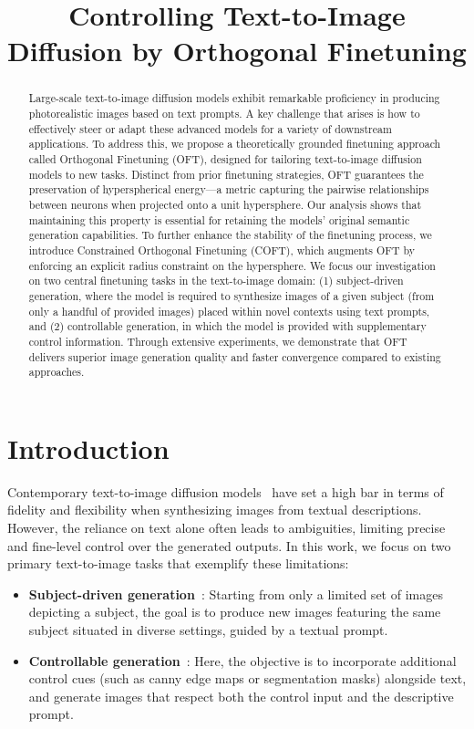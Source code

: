 \title{Controlling Text-to-Image Diffusion by Orthogonal Finetuning}

\begin{abstract}
Large-scale text-to-image diffusion models exhibit remarkable proficiency in producing photorealistic images based on text prompts. A key challenge that arises is how to effectively steer or adapt these advanced models for a variety of downstream applications. To address this, we propose a theoretically grounded finetuning approach called Orthogonal Finetuning (OFT), designed for tailoring text-to-image diffusion models to new tasks. Distinct from prior finetuning strategies, OFT guarantees the preservation of hyperspherical energy—a metric capturing the pairwise relationships between neurons when projected onto a unit hypersphere. Our analysis shows that maintaining this property is essential for retaining the models' original semantic generation capabilities. To further enhance the stability of the finetuning process, we introduce Constrained Orthogonal Finetuning (COFT), which augments OFT by enforcing an explicit radius constraint on the hypersphere. We focus our investigation on two central finetuning tasks in the text-to-image domain: (1) subject-driven generation, where the model is required to synthesize images of a given subject (from only a handful of provided images) placed within novel contexts using text prompts, and (2) controllable generation, in which the model is provided with supplementary control information. Through extensive experiments, we demonstrate that OFT delivers superior image generation quality and faster convergence compared to existing approaches.
\end{abstract}

\section{Introduction}

Contemporary text-to-image diffusion models~\cite{saharia2022photorealistic,ramesh2022hierarchical,rombach2022high} have set a high bar in terms of fidelity and flexibility when synthesizing images from textual descriptions. However, the reliance on text alone often leads to ambiguities, limiting precise and fine-level control over the generated outputs. In this work, we focus on two primary text-to-image tasks that exemplify these limitations:

\begin{itemize}[leftmargin=*,nosep]

    \item \textbf{Subject-driven generation}~\cite{ruiz2023dreambooth}: Starting from only a limited set of images depicting a subject, the goal is to produce new images featuring the same subject situated in diverse settings, guided by a textual prompt.
    \item \textbf{Controllable generation}~\cite{zhang2023adding,mou2023t2i}: Here, the objective is to incorporate additional control cues (such as canny edge maps or segmentation masks) alongside text, and generate images that respect both the control input and the descriptive prompt.
\end{itemize}

